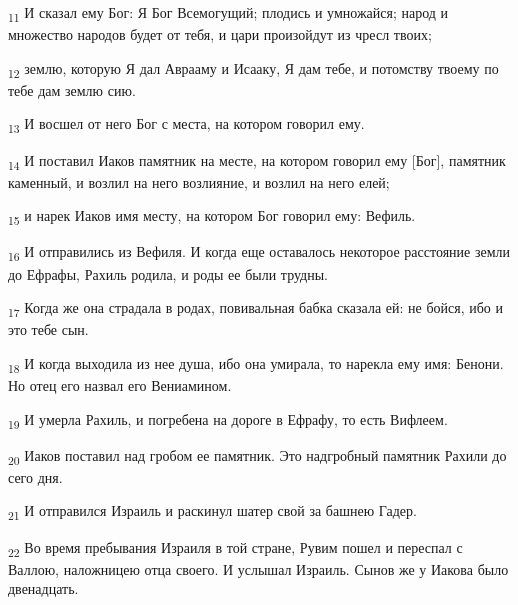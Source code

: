 \begin{tcolorbox}
\textsubscript{11} И сказал ему Бог: Я Бог Всемогущий; плодись и умножайся; народ и множество народов будет от тебя, и цари произойдут из чресл твоих;
\end{tcolorbox}
\begin{tcolorbox}
\textsubscript{12} землю, которую Я дал Аврааму и Исааку, Я дам тебе, и потомству твоему по тебе дам землю сию.
\end{tcolorbox}
\begin{tcolorbox}
\textsubscript{13} И восшел от него Бог с места, на котором говорил ему.
\end{tcolorbox}
\begin{tcolorbox}
\textsubscript{14} И поставил Иаков памятник на месте, на котором говорил ему [Бог], памятник каменный, и возлил на него возлияние, и возлил на него елей;
\end{tcolorbox}
\begin{tcolorbox}
\textsubscript{15} и нарек Иаков имя месту, на котором Бог говорил ему: Вефиль.
\end{tcolorbox}
\begin{tcolorbox}
\textsubscript{16} И отправились из Вефиля. И когда еще оставалось некоторое расстояние земли до Ефрафы, Рахиль родила, и роды ее были трудны.
\end{tcolorbox}
\begin{tcolorbox}
\textsubscript{17} Когда же она страдала в родах, повивальная бабка сказала ей: не бойся, ибо и это тебе сын.
\end{tcolorbox}
\begin{tcolorbox}
\textsubscript{18} И когда выходила из нее душа, ибо она умирала, то нарекла ему имя: Бенони. Но отец его назвал его Вениамином.
\end{tcolorbox}
\begin{tcolorbox}
\textsubscript{19} И умерла Рахиль, и погребена на дороге в Ефрафу, то есть Вифлеем.
\end{tcolorbox}
\begin{tcolorbox}
\textsubscript{20} Иаков поставил над гробом ее памятник. Это надгробный памятник Рахили до сего дня.
\end{tcolorbox}
\begin{tcolorbox}
\textsubscript{21} И отправился Израиль и раскинул шатер свой за башнею Гадер.
\end{tcolorbox}
\begin{tcolorbox}
\textsubscript{22} Во время пребывания Израиля в той стране, Рувим пошел и переспал с Валлою, наложницею отца своего. И услышал Израиль. Сынов же у Иакова было двенадцать.
\end{tcolorbox}
